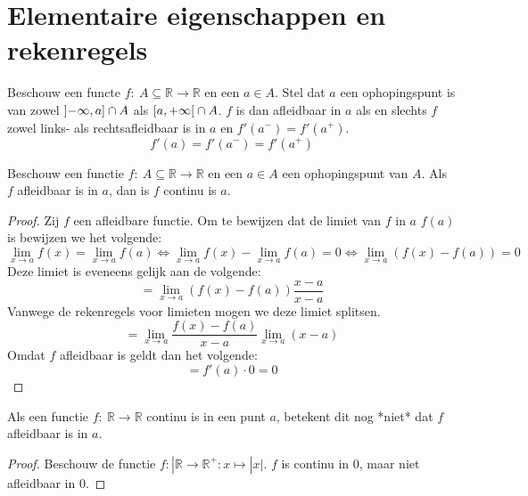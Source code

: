 \documentclass[main.tex]{subfiles}
\begin{document}
\section{Elementaire eigenschappen en rekenregels}
\label{sec:elem-eigensch-en}

\begin{pr}
  Beschouw een functe $f:\ A \subseteq \mathbb{R} \rightarrow \mathbb{R}$ en een $a\in A$.
  Stel dat $a$ een ophopingspunt is van zowel $\interval[open left]{-\infty}{a} \cap A$ als $\interval[open right]{a}{+\infty} \cap A$.
  $f$ is dan afleidbaar in $a$ als en slechts $f$ zowel links- als rechtsafleidbaar is in $a$ en $f'(a^{-})=f'(a^{+})$.
  \[ f'(a) = f'(a^{-})=f'(a^{+}) \]
\end{pr}

\begin{pr}
  \label{pr:afleidbaar-dan-continu}
  Beschouw een functie $f:\ A \subseteq \mathbb{R} \rightarrow \mathbb{R}$ en een $a\in A$ een ophopingspunt van $A$.
  Als $f$ afleidbaar is in $a$, dan is $f$ continu is $a$.

  \begin{proof}
    Zij $f$ een afleidbare functie.
    Om te bewijzen dat de limiet van $f$ in $a$ $f(a)$ is bewijzen we het volgende:
    \[  \lim_{x \rightarrow a}f(x)=\lim_{x \rightarrow a}f(a) \Leftrightarrow \lim_{x \rightarrow a}f(x)-\lim_{x \rightarrow a}f(a) = 0 \Leftrightarrow  \lim_{x \rightarrow a}\left(f(x)-f(a)\right) = 0 \]
    Deze limiet is eveneens gelijk aan de volgende:
    \[ = \lim_{x \rightarrow a}\left(f(x)-f(a)\right)\frac{x-a}{x-a} \]
    Vanwege de rekenregels voor limieten mogen we deze limiet splitsen.
    \[ = \lim_{x \rightarrow a}\frac{f(x)-f(a)}{x-a}\lim_{x \rightarrow a}(x-a) \]
    Omdat $f$ afleidbaar is geldt dan het volgende:
    \[ = f'(a)\cdot 0 = 0 \]
  \end{proof}
\end{pr}

\begin{tvb}
  Als een functie $f:\ \mathbb{R} \rightarrow \mathbb{R}$ continu is in een punt $a$, betekent dit nog *niet* dat $f$ afleidbaar is in $a$.

  \begin{proof}
    Beschouw de functie $f:| \mathbb{R} \rightarrow \mathbb{R}^{+}: x \mapsto |x|$.
    $f$ is continu in $0$, maar niet afleidbaar in $0$.
  \end{proof}
\end{tvb}
\end{document}
